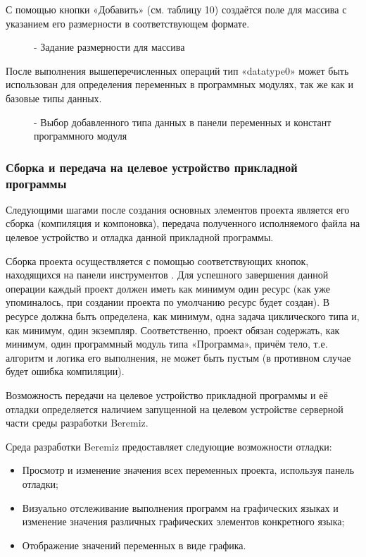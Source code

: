 \documentclass[letterpaper,10pt,russian]{sphinxmanual}
\begin{document}
С помощью кнопки «Добавить» (см. таблицу 10) создаётся поле для массива
с указанием его размерности в соответствующем формате.
\begin{figure}[htbp]
\centering
\capstart

\noindent{}
\caption{- Задание размерности для массива}\label{usage_guide/work_with_project:image206}\end{figure}

После выполнения вышеперечисленных операций тип «datatype0» может быть
использован для определения переменных в программных модулях, так же как
и базовые типы данных.
\begin{figure}[htbp]
\centering
\capstart

\noindent{}
\caption{- Выбор добавленного типа данных в панели переменных и констант программного модуля}\label{usage_guide/work_with_project:image207}\end{figure}


\subsubsection{Сборка и передача на целевое устройство прикладной программы}
\label{usage_guide/work_with_project:id14}
Следующими шагами после создания основных элементов проекта является его
сборка (компиляция и компоновка), передача полученного исполняемого
файла на целевое устройство и отладка данной прикладной программы.

Сборка проекта осуществляется с помощью соответствующих кнопок,
находящихся на панели инструментов . Для успешного
завершения данной операции каждый проект должен иметь как минимум один
ресурс (как уже упоминалось, при создании проекта по умолчанию ресурс
будет создан). В ресурсе должна быть определена, как минимум, одна
задача циклического типа и, как минимум, один экземпляр. Соответственно,
проект обязан содержать, как минимум, один программный модуль типа
«Программа», причём тело, т.е. алгоритм и логика его выполнения, не
может быть пустым (в противном случае будет ошибка компиляции).

Возможность передачи на целевое устройство прикладной программы и её
отладки определяется наличием запущенной на целевом устройстве серверной
части среды разработки Beremiz.

Среда разработки Beremiz предоставляет следующие возможности отладки:
\begin{itemize}
\item {} 
Просмотр и изменение значения всех переменных проекта, используя
панель отладки;

\item {} 
Визуально отслеживание выполнения программ на графических языках и
изменение значения различных графических элементов конкретного языка;

\item {} 
Отображение значений переменных в виде графика.

\end{itemize}
\end{document}
